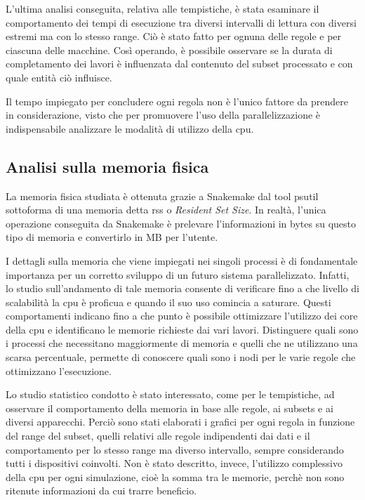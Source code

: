 L'ultima analisi conseguita, relativa alle tempistiche, è stata esaminare il comportamento dei tempi di esecuzione tra diversi intervalli di lettura con diversi estremi ma con lo stesso range.
Ciò è stato fatto per ognuna delle regole e per ciascuna delle macchine.
Così operando, è possibile osservare se la durata di completamento dei lavori è influenzata dal contenuto del subset processato e con quale entità ciò influisce.

Il tempo impiegato per concludere ogni regola non è l'unico fattore da prendere in considerazione, visto che per promuovere l'uso della parallelizzazione è indispensabile analizzare le modalità di utilizzo della cpu. 

\subsection{Analisi sulla memoria fisica}
La memoria fisica studiata è ottenuta grazie a Snakemake dal tool psutil sottoforma di una memoria detta rss o \textit{Resident Set Size}. 
In realtà, l'unica operazione conseguita da Snakemake è prelevare l'informazioni in bytes su questo tipo di memoria e convertirlo in MB per l'utente.

I dettagli sulla memoria che viene impiegati nei singoli processi è di fondamentale importanza per un corretto sviluppo di un futuro sistema parallelizzato.
Infatti, lo studio sull'andamento di tale memoria consente di verificare fino a che livello di scalabilità la cpu è proficua e quando il suo uso comincia a saturare.
Questi comportamenti indicano fino a che punto è possibile ottimizzare l'utilizzo dei core della cpu e identificano le memorie richieste dai vari lavori.
Distinguere quali sono i processi che necessitano maggiormente di memoria e quelli che ne utilizzano una scarsa percentuale, permette di conoscere quali sono i nodi per le varie regole che ottimizzano l'esecuzione.

Lo studio statistico condotto è stato interessato, come per le tempistiche, ad osservare il comportamento della memoria in base alle regole, ai subsets e ai diversi apparecchi.
Perciò sono stati elaborati i grafici per ogni regola in funzione del range del subset, quelli relativi alle regole indipendenti dai dati e il comportamento per lo stesso range ma diverso intervallo, sempre considerando tutti i dispositivi coinvolti.
Non è stato descritto, invece, l'utilizzo complessivo della cpu per ogni simulazione, cioè la somma tra le memorie, perchè non sono ritenute informazioni da cui trarre beneficio. 
    

